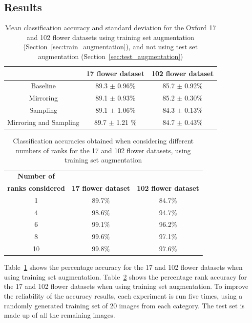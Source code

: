 \documentclass[11pt, a4paper]{report}
\begin{document}
\subsection{Results}

\begin{table}[h]
\centering 
\renewcommand{\arraystretch}{1.3}
\begin{tabular}{c|cc}
  & {\bf 17 flower dataset} & {\bf 102 flower dataset} \\
  \hline
  Baseline & 89.3 $\pm$ 0.96\% & 85.7 $\pm$ 0.92\% \\
  Mirroring & 89.1 $\pm$ 0.93\% & 85.2 $\pm$ 0.30\% \\
  Sampling & 89.1 $\pm$ 1.06\% & 84.3 $\pm$ 0.13\% \\
  Mirroring and Sampling & 89.7 $\pm$ 1.21 \% & 84.7 $\pm$ 0.43\% 
\end{tabular}
\renewcommand{\arraystretch}{1}
\caption{Mean classification accuracy and standard deviation for the Oxford 17 and 102 flower datasets using training set augmentation (Section~\ref{sec:train_augmentation}), and not using test set augmentation (Section~\ref{sec:test_augmentation})}
\label{table:accuracy}
\end{table}

\begin{table}[h]
\centering 
\renewcommand{\arraystretch}{1.3}
\begin{tabular}{c|cc}
  {\bf Number of}\\ {\bf ranks considered} & {\bf 17 flower dataset} & {\bf 102 flower dataset} \\
  \hline
  1 & 89.7\% & 84.7\% \\
  4 & 98.6\% & 94.7\% \\
  6 & 99.1\% & 96.2\% \\
  8 & 99.6\% & 97.1\% \\
  10 & 99.8\% & 97.6\% 
\end{tabular}
\renewcommand{\arraystretch}{1}
\caption{Classification accuracies obtained when considering different numbers of ranks for the 17 and 102 flower datasets, using training set augmentation}
\label{table:rank}
\end{table}


Table~\ref{table:accuracy} shows the percentage accuracy for the 17 and 102 flower datasets when using training set augmentation. Table~\ref{table:rank} shows the percentage rank accuracy for the 17 and 102 flower datasets when using training set augmentation. To improve the reliability of the accuracy results, each experiment is run five times, using a randomly generated training set of 20 images from each category. The test set is made up of all the remaining images. 
\end{document}
